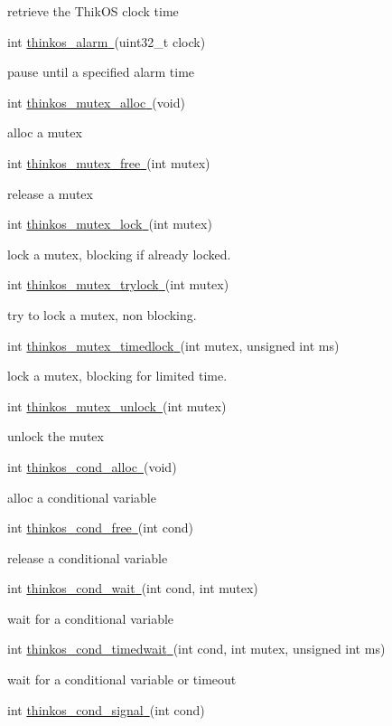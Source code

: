 {{retrieve the ThikOS clock time }

{int
}{\protect\hyperlink{h.35nkun2}{thinkos\_alarm}}{\protect\hyperlink{h.35nkun2}{~}}{(uint32\_t
clock)}

{pause until a specified alarm time }

{int
}{\protect\hyperlink{h.44sinio}{thinkos\_mutex\_alloc}}{\protect\hyperlink{h.44sinio}{~}}{(void)}

{alloc a mutex }

{int
}{\protect\hyperlink{h.2jxsxqh}{thinkos\_mutex\_free}}{\protect\hyperlink{h.2jxsxqh}{~}}{(int
mutex)}

{release a mutex }

{int
}{\protect\hyperlink{h.z337ya}{thinkos\_mutex\_lock}}{\protect\hyperlink{h.z337ya}{~}}{(int
mutex)}

{lock a mutex, blocking if already locked. }

{int
}{\protect\hyperlink{h.3j2qqm3}{thinkos\_mutex\_trylock}}{\protect\hyperlink{h.3j2qqm3}{~}}{(int
mutex)}

{try to lock a mutex, non blocking. }

{int
}{\protect\hyperlink{h.1y810tw}{thinkos\_mutex\_timedlock}}{\protect\hyperlink{h.1y810tw}{~}}{(int
mutex, unsigned int ms)}

{lock a mutex, blocking for limited time. }

{int
}{\protect\hyperlink{h.4i7ojhp}{thinkos\_mutex\_unlock}}{\protect\hyperlink{h.4i7ojhp}{~}}{(int
mutex)}

{unlock the mutex }

{int
}{\protect\hyperlink{h.1ci93xb}{thinkos\_cond\_alloc}}{\protect\hyperlink{h.1ci93xb}{~}}{(void)}

{alloc a conditional variable }

{int
}{\protect\hyperlink{h.3whwml4}{thinkos\_cond\_free}}{\protect\hyperlink{h.3whwml4}{~}}{(int
cond)}

{release a conditional variable }

{int
}{\protect\hyperlink{h.2bn6wsx}{thinkos\_cond\_wait}}{\protect\hyperlink{h.2bn6wsx}{~}}{(int
cond, int mutex)}

{wait for a conditional variable }

{int
}{\protect\hyperlink{h.qsh70q}{thinkos\_cond\_timedwait}}{\protect\hyperlink{h.qsh70q}{~}}{(int
cond, int mutex, unsigned int ms)}

{wait for a conditional variable or timeout }

{int
}{\protect\hyperlink{h.3as4poj}{thinkos\_cond\_signal}}{\protect\hyperlink{h.3as4poj}{~}}{(int
cond)}

}
